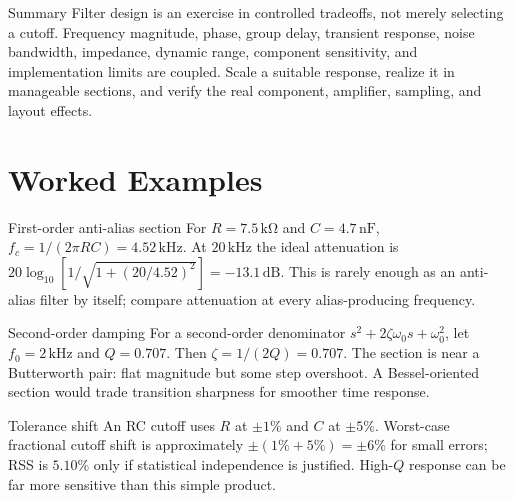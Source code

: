 \documentclass[10pt,letterpaper]{article}
\begin{document}
\begin{CornellNotesTable}
\end{CornellNotesTable}
\begin{CornellSummaryBox}{Summary}
Filter design is an exercise in controlled tradeoffs, not merely selecting a cutoff. Frequency magnitude, phase, group delay, transient response, noise bandwidth, impedance, dynamic range, component sensitivity, and implementation limits are coupled. Scale a suitable response, realize it in manageable sections, and verify the real component, amplifier, sampling, and layout effects.
\end{CornellSummaryBox}
\section{Worked Examples}
\begin{CornellExamBox}{First-order anti-alias section}
For $R=7.5\,\mathrm{k\Omega}$ and $C=4.7\,\mathrm{nF}$, $f_c=1/(2\pi RC)=4.52\,\mathrm{kHz}$. At $20\,\mathrm{kHz}$ the ideal attenuation is $20\log_{10}[1/\sqrt{1+(20/4.52)^2}]=-13.1\,\mathrm{dB}$. This is rarely enough as an anti-alias filter by itself; compare attenuation at every alias-producing frequency.
\end{CornellExamBox}
\begin{CornellExamBox}{Second-order damping}
For a second-order denominator $s^2+2\zeta\omega_0s+\omega_0^2$, let $f_0=2\,\mathrm{kHz}$ and $Q=0.707$. Then $\zeta=1/(2Q)=0.707$. The section is near a Butterworth pair: flat magnitude but some step overshoot. A Bessel-oriented section would trade transition sharpness for smoother time response.
\end{CornellExamBox}
\begin{CornellExamBox}{Tolerance shift}
An RC cutoff uses $R$ at $\pm1\%$ and $C$ at $\pm5\%$. Worst-case fractional cutoff shift is approximately $\pm(1\%+5\%)=\pm6\%$ for small errors; RSS is $5.10\%$ only if statistical independence is justified. High-$Q$ response can be far more sensitive than this simple product.
\end{CornellExamBox}
\end{document}
